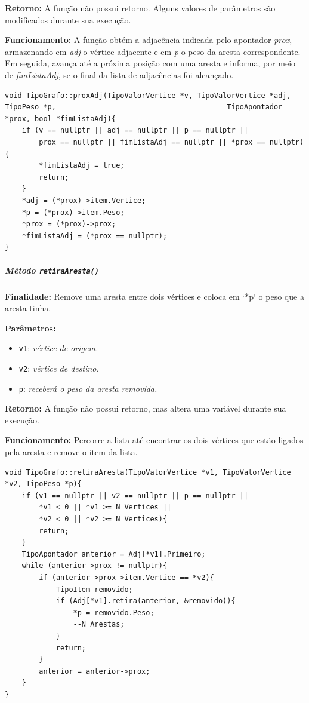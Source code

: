 \documentclass{article}
\begin{document}
    \textbf{Retorno:} A função não possui retorno. Alguns valores de parâmetros são modificados durante sua execução.

    \textbf{Funcionamento:} A função obtém a adjacência indicada pelo apontador \textit{prox}, armazenando em \textit{adj} o vértice adjacente e em \textit{p} o peso da aresta correspondente. Em seguida, avança até a próxima posição com uma aresta e informa, por meio de \textit{fimListaAdj}, se o final da lista de adjacências foi alcançado.

\begin{verbatim}
void TipoGrafo::proxAdj(TipoValorVertice *v, TipoValorVertice *adj, TipoPeso *p,                                        TipoApontador *prox, bool *fimListaAdj){
    if (v == nullptr || adj == nullptr || p == nullptr ||
        prox == nullptr || fimListaAdj == nullptr || *prox == nullptr){
        *fimListaAdj = true;
        return;
    }
    *adj = (*prox)->item.Vertice;
    *p = (*prox)->item.Peso;
    *prox = (*prox)->prox;
    *fimListaAdj = (*prox == nullptr);
}
\end{verbatim}

\subparagraph{Método \texttt{retiraAresta()}}

    \mbox{}\par
    \noindent
    \textbf{Finalidade:} Remove uma aresta entre dois vértices e coloca em `*p` o peso que a aresta tinha.

    \textbf{Parâmetros:}
    \begin{itemize}
       \item \texttt{v1}: \textit{vértice de origem.}
       \item \texttt{v2}: \textit{vértice de destino.}
       \item \texttt{p}: \textit{receberá o peso da aresta removida.}

    \end{itemize}

    \textbf{Retorno:} A função não possui retorno, mas altera uma variável durante sua execução.

    \textbf{Funcionamento:} Percorre a lista até encontrar os dois vértices que estão ligados pela aresta e remove o item da lista.

\begin{verbatim}
void TipoGrafo::retiraAresta(TipoValorVertice *v1, TipoValorVertice *v2, TipoPeso *p){
    if (v1 == nullptr || v2 == nullptr || p == nullptr ||
        *v1 < 0 || *v1 >= N_Vertices ||
        *v2 < 0 || *v2 >= N_Vertices){
        return;
    }
    TipoApontador anterior = Adj[*v1].Primeiro;
    while (anterior->prox != nullptr){
        if (anterior->prox->item.Vertice == *v2){
            TipoItem removido;
            if (Adj[*v1].retira(anterior, &removido)){
                *p = removido.Peso;
                --N_Arestas;
            }
            return;
        }
        anterior = anterior->prox;
    }
}
\end{verbatim}
\end{document}
